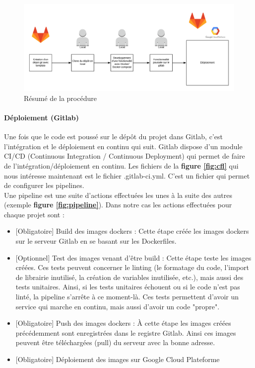 \documentclass{article} %
\begin{document}
{\begin{figure}[!h]
 \centering
 \includegraphics[keepaspectratio = true,scale=0.6]{resume.png}
 \caption{Résumé de la procédure}
 \label{fig:ress}
\end{figure}


\paragraph{Déploiement (Gitlab)\\}
Une fois que le code est poussé sur le dépôt du projet dans Gitlab, c'est l'intégration et le déploiement en continu qui suit. Gitlab dispose d'un module CI/CD (Continuous Integration / Continuous Deployment) qui permet de faire de l'intégration/déploiement en continu. Les fichiers de la \textbf{figure \ref{fig:cfl}} qui nous intéresse maintenant est le fichier .gitlab-ci.yml. C'est un fichier qui permet de configurer les pipelines.\\
Une pipeline est une suite d'actions effectuées les unes à la suite des autres (exemple \textbf{figure \ref{fig:pipeline}}). Dans notre cas les actions effectuées pour chaque projet sont : 
\begin{itemize}
 \item {[Obligatoire]} Build des images dockers : Cette étape créée les images dockers sur le serveur Gitlab en se basant sur les Dockerfiles.
 \item {[Optionnel]} Test des images venant d'être build : Cette étape teste les images créées. Ces tests peuvent concerner le linting (le formatage du code, l'import de librairie inutilisé, la création de variables inutilisée, etc.), mais aussi des tests unitaires. Ainsi, si les tests unitaires échouent ou si le code n'est pas linté, la pipeline s'arrête à ce moment-là. Ces tests permettent d'avoir un service qui marche en continu, mais aussi d'avoir un code "propre".
 \item {[Obligatoire]} Push des images dockers : À cette étape les images créées précédemment sont enregistrées dans le registre Gitlab. Ainsi ces images peuvent être téléchargées (pull) du serveur avec la bonne adresse. 
 \item {[Obligatoire]} Déploiement des images sur Google Cloud Plateforme 
\end{itemize}

}
\end{document}
